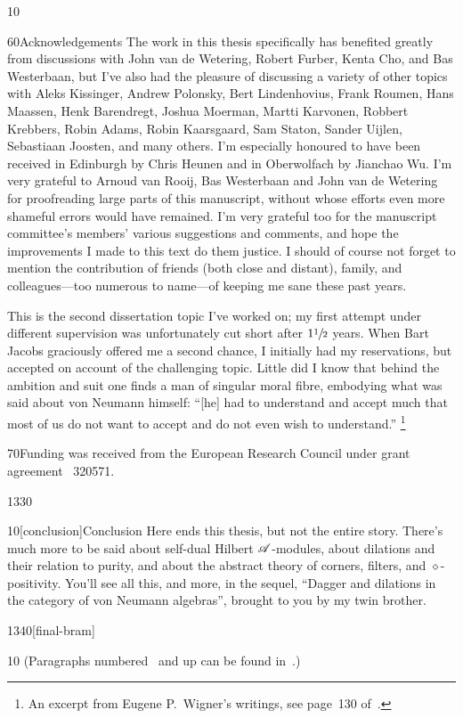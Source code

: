 \documentclass[b5paper]{book}
\begin{document}
\begin{parsec}{10}
\begin{point}{60}{Acknowledgements}
The work in this thesis specifically
has benefited greatly from
discussions
with John van de Wetering,
Robert Furber,
Kenta Cho,
and Bas Westerbaan,
but I've also had the pleasure
of discussing a variety
of other topics 
with 
Aleks Kissinger,
Andrew Polonsky,
Bert Lindenhovius,
Frank Roumen, 
Hans Maassen,
Henk Barendregt,
Joshua Moerman,
Martti Karvonen,
Robbert Krebbers,
Robin Adams, 
Robin Kaarsgaard,
Sam Staton, 
Sander Uijlen,
Sebastiaan Joosten,
and many others.
I'm especially honoured to have been received
in Edinburgh by Chris Heunen 
and in Oberwolfach
by Jianchao Wu.
I'm very grateful to
Arnoud van Rooij,
Bas Westerbaan
and
John van de Wetering
for proofreading large parts of
this manuscript,
without whose efforts
even more shameful errors would have remained.
I'm very grateful too for the manuscript committee's members' 
various suggestions and comments, and hope the improvements I made to this text
do them justice.
I should of course not forget to mention
the contribution
of friends (both close and distant),
family,
and colleagues---too numerous to name---of keeping me sane
these past years.

This is the second dissertation topic
I've worked on;
my first attempt
under different supervision
was unfortunately cut short after $1\sfrac{1}{2}$ years.
When Bart Jacobs graciously offered
me a second chance,
I initially had my reservations,
but accepted on account of the challenging topic.
Little did I know 
that behind the ambition and suit
	one finds a man
of singular moral fibre,
embodying
what was said
	about von Neumann himself:
	``[he] had to understand and accept much that most 
of us do not want to accept and do not even wish to understand.''%
\footnote{An excerpt from Eugene P.~Wigner's writings,
see page~130 of~\cite{wigner2013collected}.}
\end{point}
\begin{point}{70}{Funding} was received from the 
European Research Council under grant agreement \textnumero~320571.
\end{point}
\end{parsec}

%



\begin{parsec}{1330}%
\begin{point}{10}[conclusion]{Conclusion}
Here ends this thesis,
but not the entire story.
There's much more to be said
about self-dual Hilbert $\mathscr{A}$-modules,
about dilations and their relation to purity,
and about the abstract theory of corners, filters,
and $\diamond$-positivity.
You'll see all this,
and more,
in the sequel,
``Dagger and dilations in the category of von Neumann algebras''\cite{bas},
brought to you by my twin brother.
\end{point}
\end{parsec}
\begin{parsec}{1340}[final-bram]
\begin{point}{10}
(Paragraphs numbered~
and up can be found in~\cite{bas}.)
\end{point}
\end{parsec}
\end{document}

